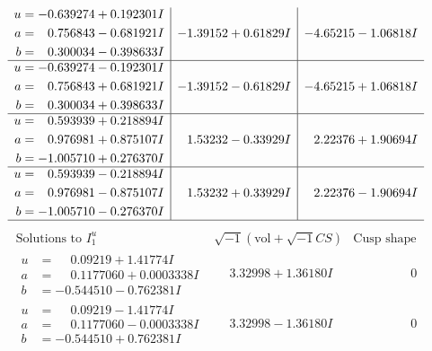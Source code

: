 \documentclass[1p]{elsarticle_modified}
\theoremstyle{definition}
\newcommand{\I}{\sqrt{-1}}
\begin{document}
$$\begin{array}{c|c|c}
\begin{aligned}
u &= -0.639274 + 0.192301 I \\
a &= \phantom{-}0.756843 - 0.681921 I \\
b &= \phantom{-}0.300034 - 0.398633 I\end{aligned}
 & -1.39152 + 0.61829 I & -4.65215 - 1.06818 I \\ \hline\begin{aligned}
u &= -0.639274 - 0.192301 I \\
a &= \phantom{-}0.756843 + 0.681921 I \\
b &= \phantom{-}0.300034 + 0.398633 I\end{aligned}
 & -1.39152 - 0.61829 I & -4.65215 + 1.06818 I \\ \hline\begin{aligned}
u &= \phantom{-}0.593939 + 0.218894 I \\
a &= \phantom{-}0.976981 + 0.875107 I \\
b &= -1.005710 + 0.276370 I\end{aligned}
 & \phantom{-}1.53232 - 0.33929 I & \phantom{-}2.22376 + 1.90694 I \\ \hline\begin{aligned}
u &= \phantom{-}0.593939 - 0.218894 I \\
a &= \phantom{-}0.976981 - 0.875107 I \\
b &= -1.005710 - 0.276370 I\end{aligned}
 & \phantom{-}1.53232 + 0.33929 I & \phantom{-}2.22376 - 1.90694 I\\
 \hline 
 \end{array}$$\newpage$$\begin{array}{c|c|c}  
\text{Solutions to }I^u_{1}& \I (\text{vol} + \sqrt{-1}CS) & \text{Cusp shape}\\
 \hline 
\begin{aligned}
u &= \phantom{-}0.09219 + 1.41774 I \\
a &= \phantom{-}0.1177060 + 0.0003338 I \\
b &= -0.544510 - 0.762381 I\end{aligned}
 & \phantom{-}3.32998 + 1.36180 I & \phantom{-0.000000 } 0 \\ \hline\begin{aligned}
u &= \phantom{-}0.09219 - 1.41774 I \\
a &= \phantom{-}0.1177060 - 0.0003338 I \\
b &= -0.544510 + 0.762381 I\end{aligned}
 & \phantom{-}3.32998 - 1.36180 I & \phantom{-0.000000 } 0 \\ \hline\begin{aligned}

\end{aligned}
\end{array}$$
\end{document}
